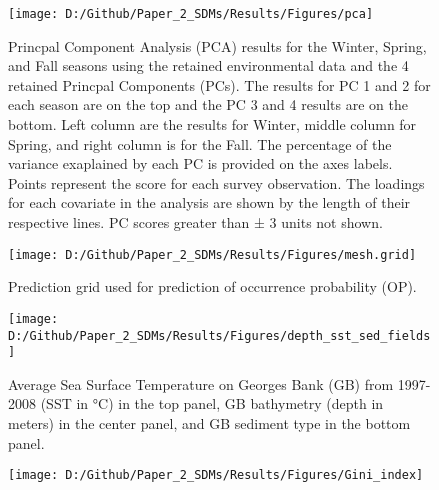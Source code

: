 \documentclass[
]{article}
\begin{document}
\newpage
\begin{landscape}
\begin{figure}[htb]

{\centering \texttt{[image: D:/Github/Paper\_2\_SDMs/Results/Figures/pca]} 

}

\caption{Princpal Component Analysis (PCA) results for the Winter, Spring, and Fall seasons using the retained environmental data and the 4 retained Princpal Components (PCs). The results for PC 1 and 2 for each season are on the top and the PC 3 and 4 results are on the bottom.  Left column are the results for Winter, middle column for Spring, and right column is for the Fall. The percentage of the variance exaplained by each PC is provided on the axes labels.  Points represent the score for each survey observation.  The loadings for each covariate in the analysis are shown by the length of their respective lines. PC scores greater than ± 3 units not shown.}\label{fig:PCA}
\end{figure}

\newpage

\clearpage
\begin{figure}[htb]

{\centering \texttt{[image: D:/Github/Paper\_2\_SDMs/Results/Figures/mesh.grid]} 

}

\caption{Prediction grid used for prediction of occurrence probability (OP).}\label{fig:mesh-grid}
\end{figure}

\clearpage
\begin{figure}[htb]

{\centering \texttt{[image: D:/Github/Paper\_2\_SDMs/Results/Figures/depth\_sst\_sed\_fields]} 

}

\caption{Average Sea Surface Temperature on Georges Bank (GB) from 1997-2008 (SST in °C) in the top panel, GB bathymetry (depth in meters) in the center panel, and GB sediment type in the bottom panel.}\label{fig:SST-Dep-Sed}
\end{figure}

\begin{landscape}
\begin{figure}[htb]

{\centering \texttt{[image: D:/Github/Paper\_2\_SDMs/Results/Figures/Gini\_index]} 

}


\end{figure}
\end{landscape}
\end{landscape}
\end{document}
